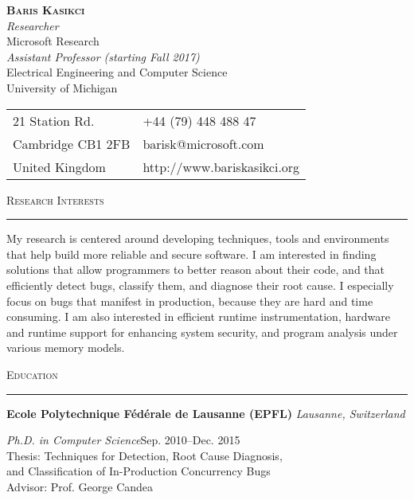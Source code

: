 \documentclass[10pt]{article}
\newcommand{\mysec}[1]{\vspace{2em}\textsc{\large #1}\vspace{1mm}\hrule\vspace{2mm}}
\newcommand{\mysub}[3]{\textbf{#1} {#2} \hfill {\em #3}}
\newcommand{\myssub}[1]{\hspace*{2mm}\parbox{163mm}{#1}\vspace*{2mm}}
\begin{document}
\begin{center}
{\Large \textbf{\textsc{Baris Kasikci}}} \vspace{1mm} \\
{\em  Researcher} \\
Microsoft Research \\
\vspace{1em}
{\em  Assistant Professor (starting Fall 2017)} \\
Electrical Engineering and Computer Science \\
University of Michigan
\end{center}

\vspace{1em}

\hspace{0.8in}
\begin{tabular}{@{}p{2.5in}p{4in}}
21 Station Rd. & +44 (79) 448 488 47\\
Cambridge CB1 2FB & barisk@microsoft.com \\
United Kingdom & http://www.bariskasikci.org \\
\end{tabular}

\vspace{1em}

\mysec{Research Interests}

My research is centered around developing techniques, tools and environments that help build more reliable and secure software. I am interested in finding solutions that allow programmers to better reason about their code, and that efficiently detect bugs, classify them, and diagnose their root cause. I especially focus on bugs that manifest in production, because they are hard and time consuming. I am also interested in efficient runtime instrumentation, hardware and runtime support for enhancing system security, and program analysis under various memory models.

\mysec{Education}

\mysub{Ecole Polytechnique F\'ed\'erale de Lausanne (EPFL)}{}{Lausanne, Switzerland} \vspace*{1mm} \\
\myssub{\vspace{2mm}\textit{Ph.D. in Computer Science}\hfill Sep. 2010--Dec. 2015 \\
Thesis: Techniques for Detection, Root Cause Diagnosis, \\ \phantom{xxxxxx} and Classification of In-Production Concurrency Bugs \\
Advisor: Prof. George Candea} \vspace{1mm}
\end{document}
